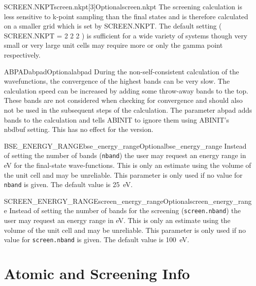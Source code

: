 \documentclass[11pt]{report}
\begin{document}
\begin{Card}{SCREEN.NKPT}{screen.nkpt[3]}{Optional}{screen.nkpt}
The screening calculation is less sensitive to k-point sampling than the final states and is therefore calculated on a smaller grid which is set by SCREEN.NKPT. The default setting ( SCREEN.NKPT = 2 2 2 ) is sufficient for a wide variety of systems though very small or very large unit cells may require more or only the gamma point respectively. 
\end{Card}

\begin{Card}{ABPAD}{abpad}{Optional}{abpad}
During the non-self-consistent calculation of the wavefunctions, the convergence of the highest bands can be very slow. The calculation speed can be increased by adding some throw-away bands to the top. These bands are not considered when checking for convergence and should also not be used in the subsequent steps of the calculation. The parameter abpad adds bands to the calculation and tells ABINIT to ignore them using ABINIT's nbdbuf setting. This has no effect for the  version. 
\end{Card}

\begin{Card}{BSE\_ENERGY\_RANGE}{bse\_energy\_range}{Optional}{bse_energy_range}
Instead of setting the number of bands (\texttt{nband}) the user may request an energy range in eV for the final-state wave-functions. 
This is only an estimate using the volume of the unit cell and may be unreliable. 
This parameter is only used if no value for \texttt{nband} is given. The default value is 25~eV.
\end{Card}

\begin{Card}{SCREEN\_ENERGY\_RANGE}{screen\_energy\_range}{Optional}{screen_energy_range}
Instead of setting the number of bands for the screening (\texttt{screen.nband}) the user may request an energy range in eV. 
This is only an estimate using the volume of the unit cell and may be unreliable. 
This parameter is only used if no value for \texttt{screen.nband} is given. The default value is 100~eV. 
\end{Card}

\section{Atomic and Screening Info}
\label{sec:AS-Info}
\end{document}
